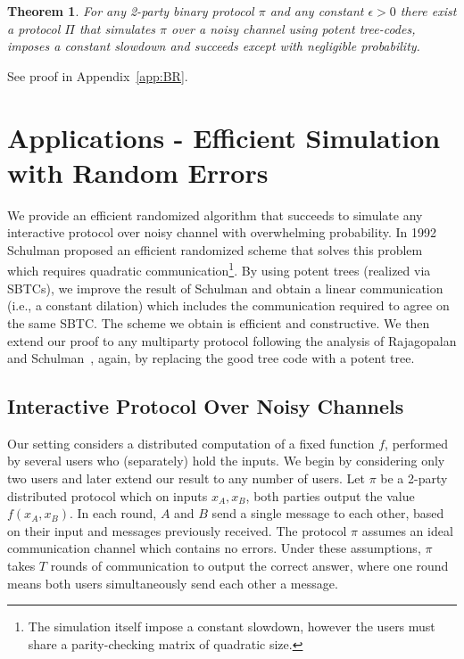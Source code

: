 \documentclass[ letterpaper, 11pt]{article}
\newtheorem{theorem}{Theorem}[section]
\newcommand{\potent}{potent\xspace}
\newcommand{\KTC}{\textsf{SBTC}\xspace}
\begin{document}
\begin{theorem}\label{thm:BR}
For any 2-party binary protocol $\pi$ and any constant $\epsilon>0$ there exist a
protocol $\Pi$ that simulates $\pi$ over a noisy channel using \potent tree-codes,
imposes a constant slowdown
and succeeds except with negligible probability.
\end{theorem}
\noindent See proof in Appendix~\ref{app:BR}.

\section{Applications - Efficient Simulation with   Random Errors }\label{sec:app}



We provide an efficient randomized algorithm that succeeds to simulate
any interactive protocol over noisy channel with overwhelming probability.
In 1992 Schulman proposed an efficient randomized scheme that solves this
problem~\cite{schulman92} which requires quadratic communication\footnote{The simulation itself impose a constant slowdown, however the users must share a parity-checking matrix of quadratic size.}.
By using potent trees (realized via \KTC{}s), we improve the result of Schulman and obtain
a linear communication (i.e., a constant dilation) which includes the communication required to agree on the same \KTC.
The scheme we obtain is efficient and constructive.
We then extend our proof to any multiparty protocol following the analysis of Rajagopalan and Schulman~\cite{RS94}, again, by replacing the good tree code with a potent tree.


\subsection{Interactive Protocol Over Noisy Channels}
Our setting considers a distributed computation of a fixed function $f$, performed by several
users who (separately) hold the inputs. We begin by considering only two users and later
extend our result to any number of users.
Let $\pi$ be a 2-party distributed protocol
which on inputs $x_A, x_B$, both parties output the value $f(x_A,x_B)$.
In each round, $A$ and $B$ send a single message to each other, based on their input and
messages previously received. The protocol $\pi$ assumes an ideal communication channel which
contains no errors. Under these assumptions, $\pi$ takes $T$ rounds of communication to output the correct answer, where one round means both users simultaneously send each other a message.
\end{document}
